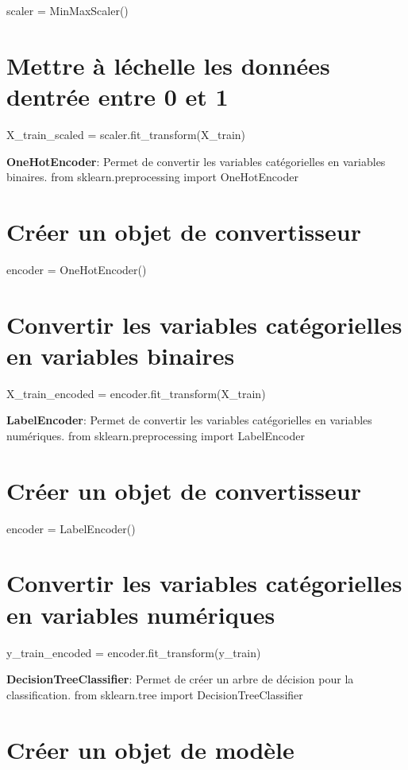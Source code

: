 scaler = Min\+Max\+Scaler() \section*{Mettre à l\textquotesingle{}échelle les données d\textquotesingle{}entrée entre 0 et 1}

X\+\_\+train\+\_\+scaled = scaler.\+fit\+\_\+transform(\+X\+\_\+train)


\begin{DoxyEnumerate}
\item {\bfseries One\+Hot\+Encoder}\+: Permet de convertir les variables catégorielles en variables binaires. from sklearn.\+preprocessing import One\+Hot\+Encoder \section*{Créer un objet de convertisseur}
\end{DoxyEnumerate}

encoder = One\+Hot\+Encoder() \section*{Convertir les variables catégorielles en variables binaires}

X\+\_\+train\+\_\+encoded = encoder.\+fit\+\_\+transform(\+X\+\_\+train)


\begin{DoxyEnumerate}
\item {\bfseries Label\+Encoder}\+: Permet de convertir les variables catégorielles en variables numériques. from sklearn.\+preprocessing import Label\+Encoder \section*{Créer un objet de convertisseur}
\end{DoxyEnumerate}

encoder = Label\+Encoder() \section*{Convertir les variables catégorielles en variables numériques}

y\+\_\+train\+\_\+encoded = encoder.\+fit\+\_\+transform(y\+\_\+train)


\begin{DoxyEnumerate}
\item {\bfseries Decision\+Tree\+Classifier}\+: Permet de créer un arbre de décision pour la classification. from sklearn.\+tree import Decision\+Tree\+Classifier \section*{Créer un objet de modèle}
\end{DoxyEnumerate}

